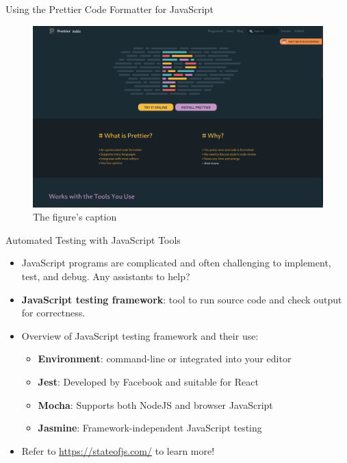 \documentclass[14pt,aspectratio=169]{beamer}
\begin{document}
%
\begin{frame}{Using the Prettier Code Formatter for JavaScript}
  \begin{figure}
    \centering
    \includegraphics[scale=.080]{images/prettier.png}
    \caption{The figure's caption}
  \end{figure}
\end{frame}

%
\begin{frame}{Automated Testing with JavaScript Tools}
  \begin{itemize}
    \item JavaScript programs are complicated and often challenging to
      implement, test, and debug. Any assistants to help?
      \vspace*{-.15in}
    \item {\bf JavaScript testing framework}: tool to run source code and check
      output for correctness.
      \vspace*{-.15in}
    \item Overview of JavaScript testing framework and their use:
      \begin{itemize}
        \item {\bf Environment}: command-line or integrated into your editor
        \item {\bf Jest}: Developed by Facebook and suitable for React
        \item {\bf Mocha}: Supports both NodeJS and browser JavaScript
        \item {\bf Jasmine}: Framework-independent JavaScript testing
      \end{itemize}
      \vspace*{-.25in}
    \item Refer to \url{https://stateofjs.com/} to learn more!
  \end{itemize}
\end{frame}
\end{document}
